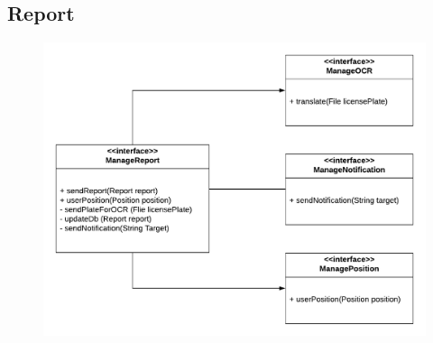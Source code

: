 \documentclass[12pt,a4paper]{report}
\begin{document}
			\subsection{Report}
				\begin{figure}[H]
						\includegraphics[width = \textwidth, center]{reportInterface}
						\label{fig: interfaces}
				\end{figure}
\end{document}
